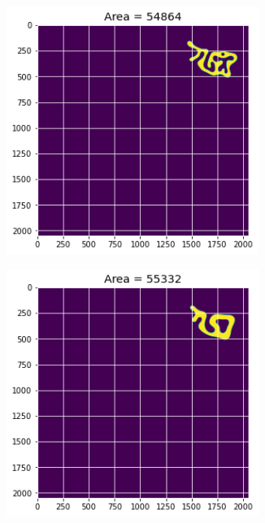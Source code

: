 \documentclass[12pt, a4paper]{report}
\begin{document}
\begin{figure}[H]
\centering
\begin{subfigure}{.24\textwidth}
  \centering
  \includegraphics[width=0.9\textwidth]{Pictures/Growth/4.1.jpeg}
  \label{img:microstrImg}
\end{subfigure}
\begin{subfigure}{.24\textwidth}
  \centering
  \includegraphics[width=0.9\textwidth]{Pictures/Growth/4.2.jpeg}

\end{subfigure}
\end{figure}
\end{document}
